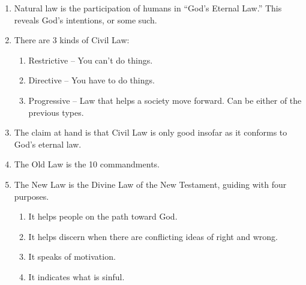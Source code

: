 \documentclass[10pt]{article}
\begin{document}
\begin{enumerate}
	\item Natural law is the participation of humans in ``God's Eternal Law.''  
		This reveals God's intentions, or some such.
	\item There are 3 kinds of Civil Law:
		\begin{enumerate}
			\item Restrictive -- You can't do things.
			\item Directive -- You have to do things.
			\item Progressive -- Law that helps a society move forward.  Can be
				either of the previous types.
		\end{enumerate}
	\item The claim at hand is that Civil Law is only good insofar as it conforms
		to God's eternal law.
	\item The Old Law is the 10 commandments.
	\item The New Law is the Divine Law of the New Testament, guiding with four
		purposes.
		\begin{enumerate}
			\item It helps people on the path toward God.
			\item It helps discern when there are conflicting ideas of right and
				wrong.
			\item It speaks of motivation.
			\item It indicates what is sinful.
		\end{enumerate}
\end{enumerate}
\end{document}
